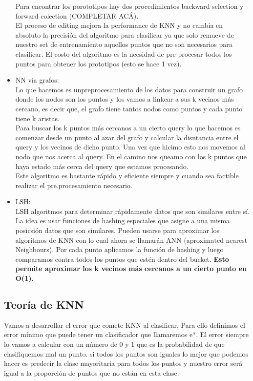 \documentclass[titlepage,a4paper]{article}
\begin{document}
\begin{itemize}
Para encontrar los porototipos hay dos procedimientos backward selection y forward colection (COMPLETAR ACÁ).\\

El proceso de editing mejora la performance de KNN y no cambia en absoluto la precisión del algoritmo para clasificar ya que solo remueve de nuestro set de entrenamiento aquellos puntos que no son necesarios para clasificar.  El costo del algoritmo es la ncesidad de pre-procesar todos los puntos para obtener los prototipos (esto se hace 1 vez). \\

\item NN vía grafos: \\

Lo que hacemos es unpreprocesamiento de los datos para construir un grafo donde los nodos son los puntos y los vamos a linkear a sus k vecinos más cercano, es decir que, el grafo tiene tantos nodos como puntos y cada punto tiene k aristas. \\ 

Para buscar los k puntos más cercanos a un cierto query lo que hacemos es comenzar desde un punto al azar del grafo y calcular la disntancia entre el query y los vecinos de dicho punto. Una vez que hicimo esto nos movemos al nodo que nos acerca al query. En el camino nos queamo con los k puntos que haya estado más cerca del query que estamos procesando. \\

Este algoritmo es bastante rápido y eficiente siempre y cuando sea factible realizar el pre.procesamiento necesario. \\

\item LSH: \\

LSH algoritmos para determinar rápidamente datos que son similares entre sí. La idea es usar funciones de hashing especiales que asigne a una misma posicsión datos que son similares. Pueden usarse para aproximar los algoritmos de KNN con lo cual ahora se llamarán ANN (aproximated nearest Neighbours). Por cada punto aplicamos la función de hashing y luego comparamos contra todos los puntos que estén dentro del bucket. \textbf{Esto permite aproximar los k vecinos más cercanos a un cierto punto en O(1).}

\end{itemize}

\subsection*{Teoría de KNN}
Vamos  a desarrollar el error que comete KNN al clasificar. Para ello definimos el error mínimo que puede tener un clasificador que llamaremos e*. El error siempre lo vamos a calcular con un número de 0 y 1 que es la probabilidad de que clasifiquemos mal un punto. si todos los puntos son iguales lo mejor que podemos hacer es predecir la clase mayoritaria para todos los puntos y nuestro error será igual a la proporción de puntos que no están en esta clase. \\
\end{document}
